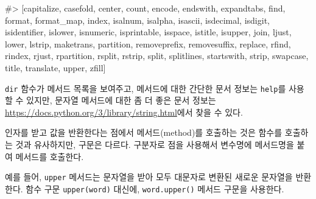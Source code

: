 \documentclass[
  letterpaper,
]{book}
\newenvironment{Shaded}{\begin{snugshade}}{\end{snugshade}}
\newcommand{\NormalTok}[1]{\textcolor[rgb]{0.00,0.23,0.31}{#1}}
\begin{document}
\begin{tcolorbox}
\begin{Shaded}
\begin{Highlighting}[]
\NormalTok{\#\textgreater{} [\textquotesingle{}capitalize\textquotesingle{}, \textquotesingle{}casefold\textquotesingle{}, \textquotesingle{}center\textquotesingle{}, \textquotesingle{}count\textquotesingle{}, \textquotesingle{}encode\textquotesingle{}, \textquotesingle{}endswith\textquotesingle{}, \textquotesingle{}expandtabs\textquotesingle{}, \textquotesingle{}find\textquotesingle{}, \textquotesingle{}format\textquotesingle{}, \textquotesingle{}format\_map\textquotesingle{}, \textquotesingle{}index\textquotesingle{}, \textquotesingle{}isalnum\textquotesingle{}, \textquotesingle{}isalpha\textquotesingle{}, \textquotesingle{}isascii\textquotesingle{}, \textquotesingle{}isdecimal\textquotesingle{}, \textquotesingle{}isdigit\textquotesingle{}, \textquotesingle{}isidentifier\textquotesingle{}, \textquotesingle{}islower\textquotesingle{}, \textquotesingle{}isnumeric\textquotesingle{}, \textquotesingle{}isprintable\textquotesingle{}, \textquotesingle{}isspace\textquotesingle{}, \textquotesingle{}istitle\textquotesingle{}, \textquotesingle{}isupper\textquotesingle{}, \textquotesingle{}join\textquotesingle{}, \textquotesingle{}ljust\textquotesingle{}, \textquotesingle{}lower\textquotesingle{}, \textquotesingle{}lstrip\textquotesingle{}, \textquotesingle{}maketrans\textquotesingle{}, \textquotesingle{}partition\textquotesingle{}, \textquotesingle{}removeprefix\textquotesingle{}, \textquotesingle{}removesuffix\textquotesingle{}, \textquotesingle{}replace\textquotesingle{}, \textquotesingle{}rfind\textquotesingle{}, \textquotesingle{}rindex\textquotesingle{}, \textquotesingle{}rjust\textquotesingle{}, \textquotesingle{}rpartition\textquotesingle{}, \textquotesingle{}rsplit\textquotesingle{}, \textquotesingle{}rstrip\textquotesingle{}, \textquotesingle{}split\textquotesingle{}, \textquotesingle{}splitlines\textquotesingle{}, \textquotesingle{}startswith\textquotesingle{}, \textquotesingle{}strip\textquotesingle{}, \textquotesingle{}swapcase\textquotesingle{}, \textquotesingle{}title\textquotesingle{}, \textquotesingle{}translate\textquotesingle{}, \textquotesingle{}upper\textquotesingle{}, \textquotesingle{}zfill\textquotesingle{}]}
\end{Highlighting}
\end{Shaded}

\texttt{dir} 함수가 메서드 목록을 보여주고, 메서드에 대한 간단한 문서
정보는 \texttt{help}를 사용할 수 있지만, 문자열 메서드에 대한 좀 더 좋은
문서 정보는 \url{https://docs.python.org/3/library/string.html}에서 찾을
수 있다.

인자를 받고 값을 반환한다는 점에서 메서드(method)를 호출하는 것은 함수를
호출하는 것과 유사하지만, 구문은 다르다. 구분자로 점을 사용해서 변수명에
메서드명을 붙여 메서드를 호출한다.

예를 들어, \texttt{upper} 메서드는 문자열을 받아 모두 대문자로 변환된
새로운 문자열을 반환한다. 함수 구문 \texttt{upper(word)} 대신에,
\texttt{word.upper()} 메서드 구문을 사용한다.

\end{tcolorbox}
\end{document}
